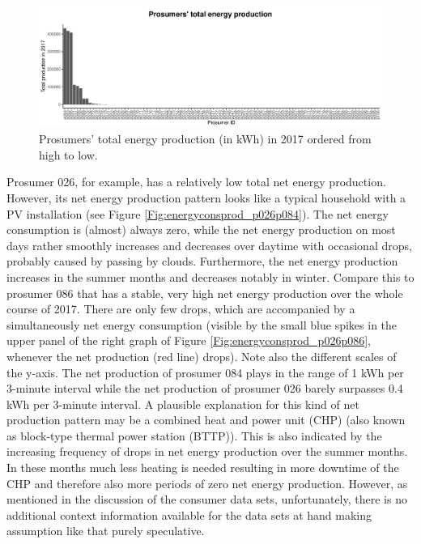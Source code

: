 \begin{figure}[htbp]
 \centering
\includegraphics[width=\textwidth]{thesis/graphs/prosumer_totalproduction2.pdf}
\caption[Prosumers’ total energy production (in kWh) in 2017 ordered from high to low]{Prosumers’ total energy production (in kWh) in 2017 ordered from high to low. \quantnet}
\label{Fig:pros_total_production}
\end{figure}

Prosumer 026, for example, has a relatively low total net energy production. However, its net energy production pattern looks like a typical household with a PV installation (see Figure \ref{Fig:energyconsprod_p026p084}). The net energy consumption is (almost) always zero, while the net energy production on most days rather smoothly increases and decreases over daytime with occasional drops, probably caused by passing by clouds. Furthermore, the net energy production increases in the summer months and decreases notably in winter. Compare this to prosumer 086 that has a stable, very high net energy production over the whole course of 2017. There are only few drops, which are accompanied by a simultaneously net energy consumption (visible by the small blue spikes in the upper panel of the right graph of Figure \ref{Fig:energyconsprod_p026p086}, whenever the net production (red line) drops). Note also the different scales of the y-axis. The net production of prosumer 084 plays in the range of 1 kWh per 3-minute interval while the net production of prosumer 026 barely surpasses 0.4 kWh per 3-minute interval. A plausible explanation for this kind of net production pattern may be a combined heat and power unit (CHP) (also known as block-type thermal power station (BTTP)). This is also indicated by the increasing frequency of drops in net energy production over the summer months. In these months much less heating is needed resulting in more downtime of the CHP and therefore also more periods of zero net energy production. However, as mentioned in the discussion of the consumer data sets, unfortunately, there is no additional context information available for the data sets at hand making assumption like that purely speculative.

